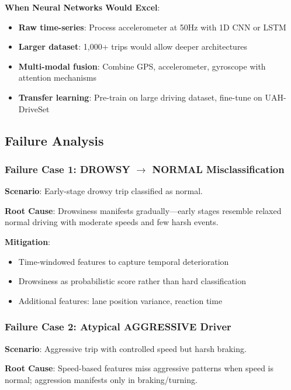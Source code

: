 \documentclass[11pt,a4paper]{article}
\begin{document}
\textbf{When Neural Networks Would Excel}:
\begin{itemize}[leftmargin=*]
    \item \textbf{Raw time-series}: Process accelerometer at 50Hz with 1D CNN or LSTM
    \item \textbf{Larger dataset}: 1,000+ trips would allow deeper architectures
    \item \textbf{Multi-modal fusion}: Combine GPS, accelerometer, gyroscope with attention mechanisms
    \item \textbf{Transfer learning}: Pre-train on large driving dataset, fine-tune on UAH-DriveSet
\end{itemize}

\subsection{Failure Analysis}

\subsubsection{Failure Case 1: DROWSY $\rightarrow$ NORMAL Misclassification}

\textbf{Scenario}: Early-stage drowsy trip classified as normal.

\textbf{Root Cause}: Drowsiness manifests gradually---early stages resemble relaxed normal driving with moderate speeds and few harsh events.

\textbf{Mitigation}:
\begin{itemize}[leftmargin=*]
    \item Time-windowed features to capture temporal deterioration
    \item Drowsiness as probabilistic score rather than hard classification
    \item Additional features: lane position variance, reaction time
\end{itemize}

\subsubsection{Failure Case 2: Atypical AGGRESSIVE Driver}

\textbf{Scenario}: Aggressive trip with controlled speed but harsh braking.

\textbf{Root Cause}: Speed-based features miss aggressive patterns when speed is normal; aggression manifests only in braking/turning.
\end{document}
